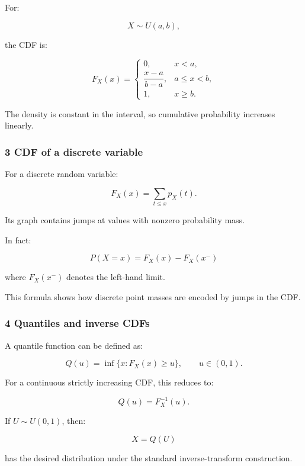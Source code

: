 \hypertarget{02-foundations-ii-ch023-cdf-of-a-uniform-variable}{}

For:

\[
 X\sim U(a,b),
\]

the CDF is:

\[
 \boxed{ F_X(x)= \begin{cases} 0,&x<a,\\ \dfrac{x-a}{b-a},&a\le x<b,\\ 1,&x\ge b. \end{cases} }
\]

The density is constant in the interval, so cumulative probability increases linearly.

\subsubsection{3 CDF of a discrete variable}\label{02-foundations-ii-ch023-cdf-of-a-discrete-variable}

\hypertarget{02-foundations-ii-ch023-cdf-of-a-discrete-variable}{}

For a discrete random variable:

\[
 F_X(x)= \sum_{t\le x}p_X(t).
\]

Its graph contains jumps at values with nonzero probability mass.

In fact:

\[
 \boxed{ P(X=x) = F_X(x)-F_X(x^-) }
\]

where \(F_X(x^-)\) denotes the left-hand limit.

This formula shows how discrete point masses are encoded by jumps in the CDF.

\subsubsection{4 Quantiles and inverse CDFs}\label{02-foundations-ii-ch023-quantiles-and-inverse-cdfs}

\hypertarget{02-foundations-ii-ch023-quantiles-and-inverse-cdfs}{}

A quantile function can be defined as:

\[
 \boxed{ Q(u)=\inf\{x:F_X(x)\ge u\} }, \qquad u\in(0,1).
\]

For a continuous strictly increasing CDF, this reduces to:

\[
 Q(u)=F_X^{-1}(u).
\]

If \(U\sim U(0,1)\), then:

\[
 X=Q(U)
\]

has the desired distribution under the standard inverse-transform construction.

